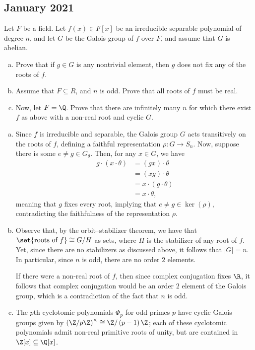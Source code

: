 \documentclass[10pt]{mypackage}
\begin{document}
\subsection{January 2021}%
\begin{problem}[Problem 1]
  Let $F$ be a field. Let $f(x)\in F[x]$ be an irreducible separable polynomial of degree $n$, and let $G$ be the Galois group of $f$ over $F$, and assume that $G$ is abelian.
  \begin{enumerate}[(a)]
    \item Prove that if $g\in G$ is any nontrivial element, then $g$ does not fix any of the roots of $f$.
    \item Assume that $F\subseteq R$, and $n$ is odd. Prove that all roots of $f$ must be real.
    \item Now, let $F = \Q$. Prove that there are infinitely many $n$ for which there exist $f$ as above with a non-real root and cyclic $G$.
  \end{enumerate}
\end{problem}
\begin{solution}\hfill
  \begin{enumerate}[(a)]
    \item Since $f$ is irreducible and separable, the Galois group $G$ acts transitively on the roots of $f$, defining a faithful representation $\rho\colon G\rightarrow S_n$. Now, suppose there is some $e\neq g\in G_{\theta}$. Then, for any $x\in G$, we have 
      \begin{align*}
        g\cdot \left( x\cdot \theta \right) &= \left( gx \right)\cdot \theta\\
                                      &= \left( xg \right)\cdot \theta\\
                                      &= x \cdot \left( g\cdot \theta \right)\\
                                      &= x\cdot \theta,
      \end{align*}
      meaning that $g$ fixes every root, implying that $e\neq g\in \ker\left( \rho \right)$, contradicting the faithfulness of the representation $\rho$.
    \item Observe that, by the orbit--stabilizer theorem, we have that $\set{\text{roots of }f}\cong G/H$ as sets, where $H$ is the stabilizer of any root of $f$. Yet, since there are no stabilizers as discussed above, it follows that $\left\vert G \right\vert = n$. In particular, since $n$ is odd, there are no order $2$ elements.

      If there were a non-real root of $f$, then since complex conjugation fixes $\R$, it follows that complex conjugation would be an order $2$ element of the Galois group, which is a contradiction of the fact that $n$ is odd.
    \item The $p$th cyclotomic polynomials $\Phi_p$ for odd primes $p$ have cyclic Galois groups given by $\left( \Z/p\Z \right)^{\times}\cong \Z/\left( p-1 \right)\Z$; each of these cyclotomic polynomials admit non-real primitive roots of unity, but are contained in $\Z[x]\subseteq \Q[x]$.
  \end{enumerate}
\end{solution}
\end{document}

